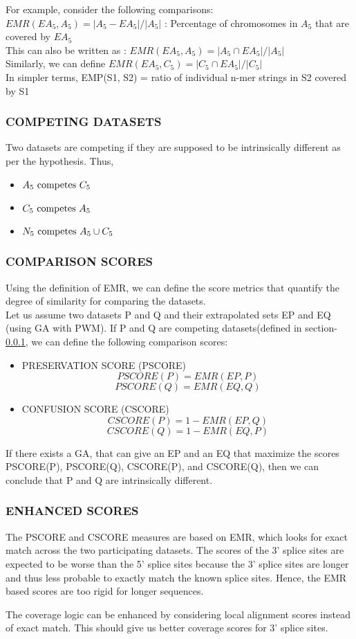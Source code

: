 \documentclass[12pt,a4paper]{article}
\begin{document}
	For example, consider the following comparisons:\\
	$ EMR(EA_5, A_5) = |A_5 - EA_5| / |A_5| $ : Percentage of chromosomes in $A_5$ that are covered by $EA_5$ \\
	This can also be written as : $ EMR(EA_5, A_5) = |A_5 \cap EA_5| / |A_5| $ \\
	Similarly, we can define $ EMR(EA_5, C_5) = |C_5 \cap EA_5| / |C_5| $ \\
	In simpler terms, EMP(S1, S2) = ratio of individual n-mer strings in S2 covered by S1

	\subsubsection{COMPETING DATASETS} \label{sec:competing}
	Two datasets are competing if they are supposed to be intrinsically different as per the hypothesis.
	Thus,
	\begin{itemize}
	\item $A_5 \textnormal{ competes } C_5$
	\item $C_5 \textnormal{ competes } A_5$
	\item $N_5 \textnormal{ competes } A_5 \cup C_5$
	\end{itemize}

	\subsubsection{COMPARISON SCORES} \label{scores}
	Using the definition of EMR, we can define the score metrics that quantify the degree of similarity for comparing the datasets.\\
	Let us assume two datasets P and Q and their extrapolated sets EP and EQ (using GA with PWM). If P and Q are competing datasets(defined in section-\ref{sec:competing}, we can define the following comparison scores:
	\begin{itemize}
		\item PRESERVATION SCORE (PSCORE)
		$$ PSCORE(P) = EMR(EP, P) $$
		$$ PSCORE(Q) = EMR(EQ, Q) $$
		\item CONFUSION SCORE (CSCORE)
		$$ CSCORE(P) = 1 - EMR(EP, Q) $$
		$$ CSCORE(Q) = 1 - EMR(EQ, P) $$
	\end{itemize}
	If there exists a GA, that can give an EP and an EQ that maximize the scores PSCORE(P), PSCORE(Q), CSCORE(P), and CSCORE(Q), then we can conclude that P and Q are intrinsically different.
	
	\subsubsection{ENHANCED SCORES} \label{score-enhanced}
	The PSCORE and CSCORE measures are based on EMR, which looks for exact match across the two participating datasets. The scores of the 3' splice sites are expected to be worse than the 5' splice sites because the 3' splice sites are longer and thus less probable to exactly match the known splice sites. Hence, the EMR based scores are too rigid for longer sequences. \par
	The coverage logic can be enhanced by considering local alignment scores instead of exact match. This should give us better coverage scores for 3' splice sites.
		
\end{document}
